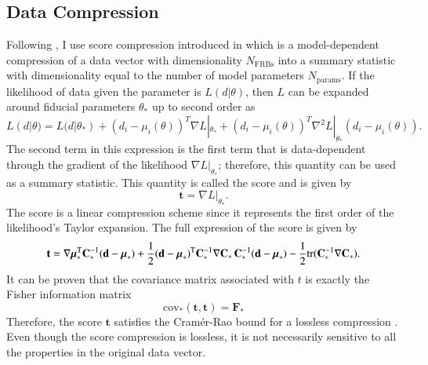 \subsection{Data Compression}\label{meth_sec:compression}
Following \citet{Konar_Reischke_Hagstotz_Nicola_Hildebrandt_2025a}, I use score compression introduced in \citet{alsing2018generalized} which is a model-dependent compression of a data vector with dimensionality $N_\mathrm{FRBs}$ into a summary statistic with dimensionality equal to the number of model parameters $N_\mathrm{params}$. If the likelihood of data given the parameter is $L(d| \theta)$, then $L$ can be expanded around fiducial parameters $\theta_\ast$ up to second order as
\begin{equation}
    L(d| \theta) = L(d| \theta_\ast) + (d_i - \mu_i(\theta))^T \nabla L|_{\theta_\ast} + (d_i - \mu_i(\theta))^T \nabla^2 L|_{\theta_\ast} (d_i - \mu_i(\theta)).
\end{equation}
The second term in this expression is the first term that is data-dependent through the gradient of the likelihood $\nabla L|_{\theta_\ast}$; therefore, this quantity can be used as a summary statistic. This quantity is called the score and is given by
\begin{equation}
    \mathbf{t} = \nabla L|_{\theta_\ast}.
\end{equation}
The score is a linear compression scheme since it represents the first order of the likelihood's Taylor expansion. The full expression of the score is given by
\begin{equation}
    \mathbf{t} = \nabla \boldsymbol{\mu}_*^{\mathrm{T}} \mathbf{C}_*^{-1} (\mathbf{d} - \boldsymbol{\mu}_*) + \frac{1}{2} (\mathbf{d} - \boldsymbol{\mu}_*)^{\mathrm{T}} \mathbf{C}_*^{-1} \nabla \mathbf{C}_* \, \mathbf{C}_*^{-1} (\mathbf{d} - \boldsymbol{\mu}_*) \notag  - \frac{1}{2} \mathrm{tr}(\mathbf{C}_*^{-1} \nabla \mathbf{C}_*).
\end{equation}
It can be proven that the covariance matrix associated with $t$ is exactly the Fisher information matrix
\begin{equation}
    \text{cov}_{\ast}(\mathbf{t}, \mathbf{t}) = \mathbf{F_\ast}
\end{equation}
Therefore, the score $\mathbf{t}$ satisfies the Cramér-Rao bound for a lossless compression \citep{rao1945information}. Even though the score compression is lossless, it is not necessarily sensitive to all the properties in the original data vector.

